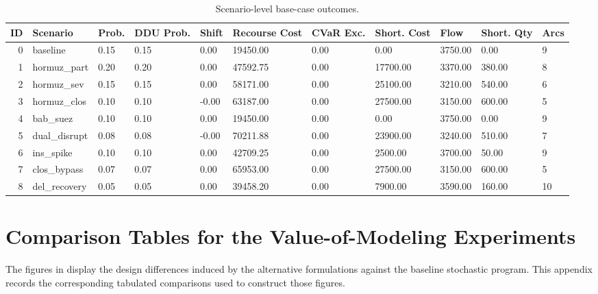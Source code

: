 \documentclass[final,3p,authoryear]{elsarticle}
\theoremstyle{definition}
\begin{document}
\begin{table}
\centering
\caption{Scenario-level base-case outcomes.}
\label{tab:tab01_scenario_outcomes}
\footnotesize %
\begin{tabularx}{\linewidth}{rlXXXXXXXXX}
\toprule
\textbf{ID} & \textbf{Scenario} & \textbf{Prob.} & \textbf{DDU Prob.} & \textbf{Shift} & \textbf{Recourse Cost} & \textbf{CVaR Exc.} & \textbf{Short. Cost} & \textbf{Flow} & \textbf{Short. Qty} & \textbf{Arcs} \\
\midrule
0 & baseline & 0.15 & 0.15 & 0.00 & 19450.00 & 0.00 & 0.00 & 3750.00 & 0.00 & 9 \\
1 & hormuz\_part & 0.20 & 0.20 & 0.00 & 47592.75 & 0.00 & 17700.00 & 3370.00 & 380.00 & 8 \\
2 & hormuz\_sev & 0.15 & 0.15 & 0.00 & 58171.00 & 0.00 & 25100.00 & 3210.00 & 540.00 & 6 \\
3 & hormuz\_clos & 0.10 & 0.10 & -0.00 & 63187.00 & 0.00 & 27500.00 & 3150.00 & 600.00 & 5 \\
4 & bab\_suez & 0.10 & 0.10 & 0.00 & 19450.00 & 0.00 & 0.00 & 3750.00 & 0.00 & 9 \\
5 & dual\_disrupt & 0.08 & 0.08 & -0.00 & 70211.88 & 0.00 & 23900.00 & 3240.00 & 510.00 & 7 \\
6 & ins\_spike & 0.10 & 0.10 & 0.00 & 42709.25 & 0.00 & 2500.00 & 3700.00 & 50.00 & 9 \\
7 & clos\_bypass & 0.07 & 0.07 & 0.00 & 65953.00 & 0.00 & 27500.00 & 3150.00 & 600.00 & 5 \\
8 & del\_recovery & 0.05 & 0.05 & 0.00 & 39458.20 & 0.00 & 7900.00 & 3590.00 & 160.00 & 10 \\
\bottomrule
\end{tabularx}
\end{table}

\section{Comparison Tables for the Value-of-Modeling Experiments}
\label{app:value-of-modeling-tables}

The figures in  display the design
differences induced by the alternative formulations against the
baseline stochastic program. This appendix records the corresponding
tabulated comparisons used to construct those figures.
\end{document}
